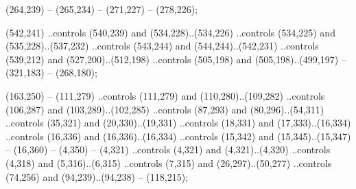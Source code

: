 (264,239) -- (265,234) -- (271,227) -- (278,226);

 (542,241)
    ..controls (540,239) and (534,228)..(534,226)
	..controls (534,225) and (535,228)..(537,232)
	..controls (543,244) and (544,244)..(542,231)
	..controls (539,212) and (527,200)..(512,198)
	..controls (505,198) and (505,198)..(499,197)
	-- (321,183) -- (268,180);
    
    


 (163,250) -- (111,279)
	..controls (111,279) and (110,280)..(109,282)
	..controls (106,287) and (103,289)..(102,285)
	..controls (87,293) and (80,296)..(54,311)
	..controls (35,321) and (20,330)..(19,331)
	..controls (18,331) and (17,333)..(16,334)
	..controls (16,336) and (16,336)..(16,334)
	..controls (15,342) and (15,345)..(15,347)
    -- (16,360) -- (4,350) -- (4,321)
    ..controls (4,321) and (4,321)..(4,320)
	..controls (4,318) and (5,316)..(6,315)
	..controls (7,315) and (26,297)..(50,277)
	..controls (74,256) and (94,239)..(94,238)
	-- (118,215);




